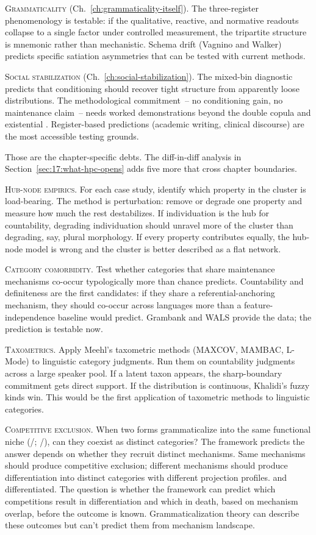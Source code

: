 \textsc{Grammaticality} (Ch.~\ref{ch:grammaticality-itself}). The three-register phenomenology is testable: if the qualitative, reactive, and normative readouts collapse to a single factor under controlled measurement, the tripartite structure is mnemonic rather than mechanistic. Schema drift (Vagnino and Walker) predicts specific satiation asymmetries that can be tested with current methods.

\textsc{Social stabilization} (Ch.~\ref{ch:social-stabilization}). The mixed-bin diagnostic predicts that conditioning should recover tight structure from apparently loose distributions. The methodological commitment~-- no conditioning gain, no maintenance claim~-- needs worked demonstrations beyond the double copula and existential . Register-based predictions (academic writing, clinical discourse) are the most accessible testing grounds.

Those are the chapter-specific debts. The diff-in-diff analysis in Section~\ref{sec:17:what-hpc-opens} adds five more that cross chapter boundaries.

\textsc{Hub-node empirics}. For each case study, identify which property in the cluster is load-bearing. The method is perturbation: remove or degrade one property and measure how much the rest destabilizes. If individuation is the hub for countability, degrading individuation should unravel more of the cluster than degrading, say, plural morphology. If every property contributes equally, the hub-node model is wrong and the cluster is better described as a flat network.

\textsc{Category comorbidity}. Test whether categories that share maintenance mechanisms co-occur typologically more than chance predicts. Countability and definiteness are the first candidates: if they share a referential-anchoring mechanism, they should co-occur across languages more than a feature-independence baseline would predict. Grambank and WALS provide the data; the prediction is testable now.

\textsc{Taxometrics}. Apply Meehl's taxometric methods (MAXCOV, MAMBAC, L-Mode) to linguistic category judgments. Run them on countability judgments across a large speaker pool. If a latent taxon appears, the sharp-boundary commitment gets direct support. If the distribution is continuous, Khalidi's fuzzy kinds win. This would be the first application of taxometric methods to linguistic categories.

\textsc{Competitive exclusion}. When two forms grammaticalize into the same functional niche (/; /), can they coexist as distinct categories? The framework predicts the answer depends on whether they recruit distinct mechanisms. Same mechanisms should produce competitive exclusion; different mechanisms should produce differentiation into distinct categories with different projection profiles.  and  differentiated. The question is whether the framework can predict which competitions result in differentiation and which in death, based on mechanism overlap, before the outcome is known. Grammaticalization theory can describe these outcomes but can't predict them from mechanism landscape.


